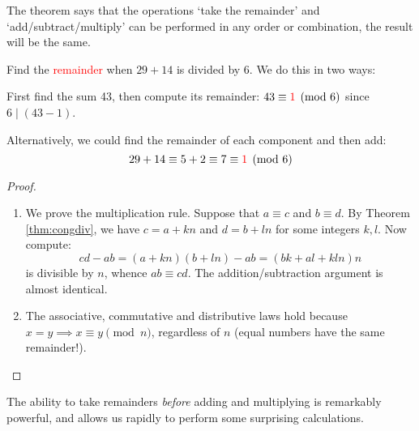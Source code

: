 The theorem says that the operations `take the remainder' and `add/subtract/multiply' can be performed in any order or combination, the result will be the same.

\begin{example}{}{}
	Find the \textcolor{red}{remainder} when $29+14$ is divided by 6. We do this in two ways:
	\begin{enumeratea}\itemsep0pt
		\item First find the sum 43, then compute its remainder: $43\equiv\textcolor{red}{1}\pmod 6$ since $6\mid(43-1)$.
		\item Alternatively, we could find the remainder of each component and then add:
		\[
			29+14\equiv 5+2\equiv 7\equiv \textcolor{red}{1}\pmod 6
		\]
	\end{enumeratea}
\end{example}

\begin{proof}
	\begin{enumerate}
	  \item We prove the multiplication rule. Suppose that $a\equiv c$ and $b\equiv d$. By Theorem \ref{thm:congdiv}, we have $c=a+kn$ and $d=b+ln$ for some integers $k,l$. Now compute:
		\[
			cd-ab=(a+kn)(b+ln)-ab =(bk+al+kln)n
		\]
		is divisible by $n$, whence $ab\equiv cd$. The addition/subtraction argument is almost identical.
		\item The associative, commutative and distributive laws hold because $x=y\implies x\equiv y\pmod n$, regardless of $n$ (equal numbers have the same remainder!).\qedhere
	\end{enumerate}	  
\end{proof}

The ability to take remainders \emph{before} adding and multiplying is remarkably powerful, and allows us rapidly to perform some surprising calculations.

